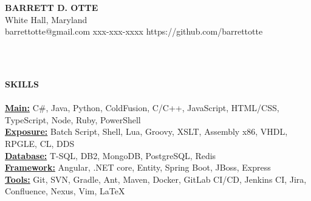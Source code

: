 \documentclass{article}
\newcommand{\lineunder}{
	\vspace*{-4pt}\\ 
	\hspace*{-18pt}\hrulefill \\
}
\newcommand{\header}[1]{
	{\hspace*{-15pt}\vspace*{6pt}\textsc{#1}}\vspace*{-6pt}\lineunder
}
\newcommand{\contact}[5]{
	\vspace*{-8pt}
	\begin{center}
		{\Large \textbf \scshape {#1}}\\
		\normalsize #2\\
		\normalsize #3 \hspace*{20pt} 
		\normalsize #4 \hspace*{20pt}
		\normalsize #5
		\lineunder
	\end{center}
	\vspace*{-8pt}
}
\newcommand{\resumeheader}[1]{
	\vspace*{5pt}
	\header{\textbf{#1}}
}
\begin{document}
	\normalsize
	\smallskip
	\vspace*{-44pt}

	\contact
		{\bfseries BARRETT D. OTTE}
		{White Hall, Maryland}
		{barrettotte@gmail.com}
		{xxx-xxx-xxxx}
		{https://github.com/barrettotte}
	
	\resumeheader{SKILLS}
		\textbf{\underline{Main:}} 
			C\#, Java, Python, ColdFusion, C/C++, JavaScript, HTML/CSS, TypeScript, Node, Ruby, PowerShell \\ \vspace*{4pt}
		\textbf{\underline{Exposure:}}
			Batch Script, Shell, Lua, Groovy, XSLT, Assembly x86, VHDL, RPGLE, CL, DDS \\ \vspace*{4pt}
		\textbf{\underline{Database:}}
			T-SQL, DB2, MongoDB, PostgreSQL, Redis \\ \vspace*{4pt}
		\textbf{\underline{Framework:}}
			Angular, .NET core, Entity, Spring Boot, JBoss, Express \\ \vspace*{4pt}
		\textbf{\underline{Tools:}}
			Git, SVN, Gradle, Ant, Maven, Docker, GitLab CI/CD, Jenkins CI, Jira, Confluence, Nexus, Vim, LaTeX \\ \vspace*{4pt}
		
\end{document}
